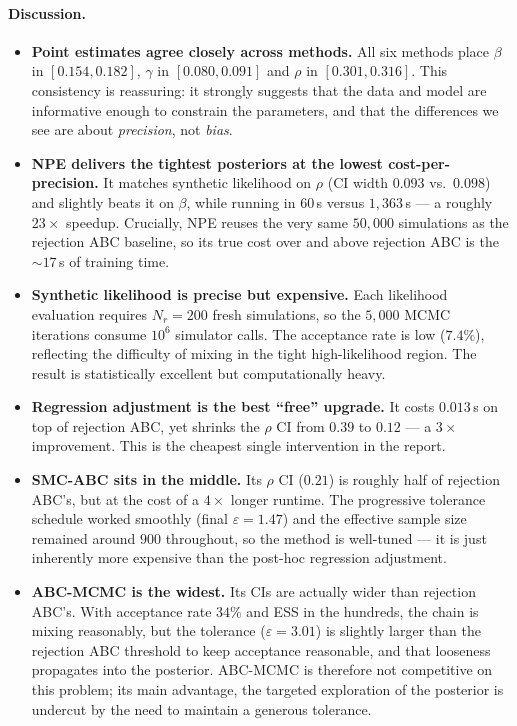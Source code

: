 \documentclass[11pt]{article}
\begin{document}
\paragraph{Discussion.}
\begin{itemize}[nosep, leftmargin=10pt]
\item \textbf{Point estimates agree closely across methods.} All six methods place $\beta$ in $[0.154, 0.182]$, $\gamma$ in $[0.080, 0.091]$ and $\rho$ in $[0.301, 0.316]$. This consistency is reassuring: it strongly suggests that the data and model are informative enough to constrain the parameters, and that the differences we see are about \emph{precision}, not \emph{bias}.
\item \textbf{NPE delivers the tightest posteriors at the lowest cost-per-precision.} It matches synthetic likelihood on $\rho$ (CI width $0.093$ vs.\ $0.098$) and slightly beats it on $\beta$, while running in $60\,$s versus $1{,}363\,$s --- a roughly $23\times$ speedup. Crucially, NPE reuses the very same $50{,}000$ simulations as the rejection ABC baseline, so its true cost over and above rejection ABC is the $\sim 17\,$s of training time.
\item \textbf{Synthetic likelihood is precise but expensive.} Each likelihood evaluation requires $N_r=200$ fresh simulations, so the $5{,}000$ MCMC iterations consume $10^6$ simulator calls. The acceptance rate is low ($7.4\%$), reflecting the difficulty of mixing in the tight high-likelihood region. The result is statistically excellent but computationally heavy.
\item \textbf{Regression adjustment is the best ``free'' upgrade.} It costs $0.013\,$s on top of rejection ABC, yet shrinks the $\rho$ CI from $0.39$ to $0.12$ --- a $3\times$ improvement. This is the cheapest single intervention in the report.
\item \textbf{SMC-ABC sits in the middle.} Its $\rho$ CI ($0.21$) is roughly half of rejection ABC's, but at the cost of a $4\times$ longer runtime. The progressive tolerance schedule worked smoothly (final $\varepsilon = 1.47$) and the effective sample size remained around $900$ throughout, so the method is well-tuned --- it is just inherently more expensive than the post-hoc regression adjustment.
\item \textbf{ABC-MCMC is the widest.} Its CIs are actually wider than rejection ABC's. With acceptance rate $34\%$ and ESS in the hundreds, the chain is mixing reasonably, but the tolerance ($\varepsilon = 3.01$) is slightly larger than the rejection ABC threshold to keep acceptance reasonable, and that looseness propagates into the posterior. ABC-MCMC is therefore not competitive on this problem; its main advantage, the targeted exploration of the posterior is undercut by the need to maintain a generous tolerance.
\end{itemize}
\end{document}
